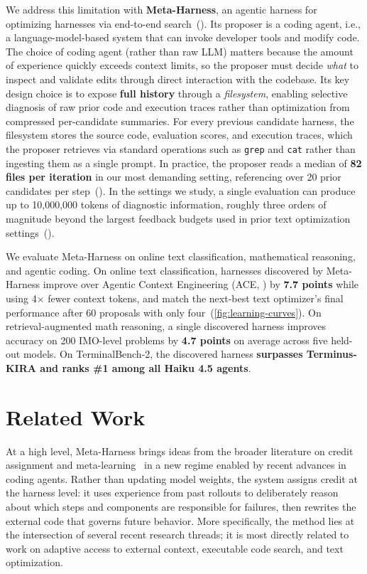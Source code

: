 We address this limitation with \textbf{Meta-Harness}, an agentic harness for optimizing harnesses via end-to-end search~().
Its proposer is a coding agent, i.e., a language-model-based system that can invoke developer tools and modify code.
The choice of coding agent (rather than raw LLM) matters because the amount of experience quickly exceeds context limits, so the proposer must decide \textit{what} to inspect and validate edits through direct interaction with the codebase.
Its key design choice is to expose \textbf{full history} through a \textit{filesystem}, enabling selective diagnosis of raw prior code and execution traces rather than optimization from compressed per-candidate summaries.
For every previous candidate harness, the filesystem stores the source code, evaluation scores, and execution traces, which the proposer retrieves via standard operations such as \texttt{grep} and \texttt{cat} rather than ingesting them as a single prompt.
In practice, the proposer reads a median of \textbf{82 files per iteration} in our most demanding setting, referencing over 20 prior candidates per step~().
In the settings we study, a single evaluation can produce up to 10,000,000 tokens of diagnostic information, roughly three orders of magnitude beyond the largest feedback budgets used in prior text optimization settings~().

We evaluate Meta-Harness on online text classification, mathematical reasoning, and agentic coding.
On online text classification, harnesses discovered by Meta-Harness improve over Agentic Context Engineering (ACE, \citet{zhang2025ace}) by \textbf{7.7 points} while using 4$\times$ fewer context tokens, and match the next-best text optimizer's final performance after $60$ proposals with only four~(\cref{fig:learning-curves}).
On retrieval-augmented math reasoning, a single discovered harness improves accuracy on 200 IMO-level problems by \textbf{4.7 points} on average across five held-out models.
On TerminalBench-2, the discovered harness \textbf{surpasses Terminus-KIRA and ranks \#1 among all Haiku 4.5 agents}.

\section{Related Work}
\label{sec:related-work}

At a high level, Meta-Harness brings ideas from the broader literature on credit assignment and meta-learning~\citep{schmidhuber1993self,thrun1998learning,andrychowicz2016learning,finn2017maml,snell2017prototypical,akyürek2023learningalgorithmincontextlearning} in a new regime enabled by recent advances in coding agents.
Rather than updating model weights, the system assigns credit at the harness level: it uses experience from past rollouts to deliberately reason about which steps and components are responsible for failures, then rewrites the external code that governs future behavior.
More specifically, the method lies at the intersection of several recent research threads; it is most directly related to work on adaptive access to external context, executable code search, and text optimization.

